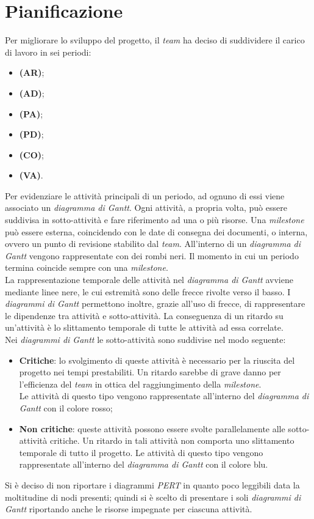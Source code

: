 \newpage
\section{Pianificazione}
Per migliorare lo sviluppo del progetto, il \textit{team} ha deciso di suddividere il carico di lavoro in sei periodi:
\begin{itemize}
	\item \textbf{\AR (AR)};
	\item \textbf{\AD (AD)};
	\item \textbf{\PA (PA)};
	\item \textbf{\PD (PD)};
	\item \textbf{\CO (CO)};
	\item \textbf{\VV (VA)}.
\end{itemize}

Per evidenziare le attività principali di un periodo, ad ognuno di essi viene associato un \textit{diagramma di Gantt}.
Ogni attività, a propria volta, può essere suddivisa in sotto-attività e fare riferimento ad una o più risorse.
Una \textit{milestone} può essere esterna, coincidendo con le date di consegna dei documenti, o interna, ovvero un punto di revisione stabilito dal \textit{team}.
All'interno di un \textit{diagramma di Gantt} vengono rappresentate con dei rombi neri.
Il momento in cui un periodo termina coincide sempre con una \textit{milestone}.\\
La rappresentazione temporale delle attività nel \textit{diagramma di Gantt} avviene mediante linee nere, le cui estremità sono delle frecce rivolte verso il basso.
I \textit{diagrammi di Gantt} permettono inoltre, grazie all'uso di frecce, di rappresentare le dipendenze tra attività e sotto-attività.
La conseguenza di un ritardo su un'attività è lo slittamento temporale di tutte le attività ad essa correlate. \\

Nei \textit{diagrammi di Gantt} le sotto-attività sono suddivise nel modo seguente:
\begin{itemize}
	\item \textbf{Critiche}: lo svolgimento di queste attività è necessario per la riuscita del progetto nei tempi prestabiliti. Un ritardo sarebbe di grave danno per l'efficienza del \textit{team} in ottica del raggiungimento della \textit{milestone}. \\
	Le attività di questo tipo vengono rappresentate all'interno del \textit{diagramma di Gantt} con il colore rosso;
	\item \textbf{Non critiche}: queste attività possono essere svolte parallelamente alle sotto-attività critiche. Un ritardo in tali attività non comporta uno slittamento temporale di tutto il progetto.
	Le attività di questo tipo vengono rappresentate all'interno del \textit{diagramma di Gantt} con il colore blu.
\end{itemize}
Si è deciso di non riportare i diagrammi \textit{PERT} in quanto poco leggibili data la moltitudine di nodi presenti; quindi si è scelto di presentare i soli \textit{diagrammi di Gantt} riportando anche le risorse impegnate per ciascuna attività.

